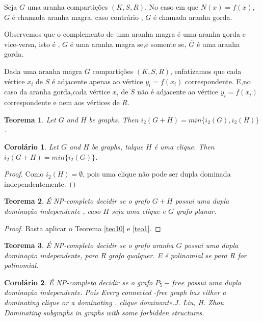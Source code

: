 \documentclass[a4paper,8pt]{article}
\theoremstyle{plain}
\newtheorem{theorem}{Teorema}[section]
\newtheorem{corollary}{Corolário}[section]
\begin{document}
Seja $G$ uma aranha compartições $(K, S, R)$. No caso em que $N(x) = f(x)$,  $G$ é chamada aranha magra,  caso contrário , $G$ é chamada aranha gorda.

Observemos que o complemento de uma aranha magra é uma aranha gorda e vice-versa, isto é , $G$ é uma aranha magra se,e somente se, $\overline{G}$ é uma aranha gorda.


Dada uma aranha magra $G$ compartições $(K, S, R)$, enfatizamos que cada vértice $x_i$ de $S$ é adjacente apenas ao vértice $y_i=f(x_i)$ correspondente. E,no caso da aranha gorda,cada vértice $x_i$ de $S$ não é adjacente ao vértice $y_i=f(x_i)$ correspondente e nem aos vértices de $R$.

\begin{theorem}\cite{leonida2018independent}
 Let $G$ and $H$ be graphs.  Then $i_2(G+H) = min\{i_2(G),i_2(H)\}$.
\end{theorem}

\begin{corollary}
 Let $G$ and $H$ be graphs, talque $H$ é uma clique.  Then $i_2(G+H) = min\{i_2(G)\}$.
\end{corollary}

\begin{proof}\label{teo10}
Como $i_2(H)=\emptyset$, pois uma clique não pode ser dupla dominada independentemente.
\end{proof}

\begin{theorem}
 É NP-completo decidir se o grafo $G+H$ possui uma dupla dominação independente , caso $H$ seja uma clique e $G$ grafo planar. 
\end{theorem}

\begin{proof}
Basta aplicar o Teorema \ref{teo10} e \ref{teo1}.
\end{proof}

\begin{theorem}

É NP-completo decidir se o grafo aranha $G$ possui uma dupla dominação independente, para $R$ grafo qualquer. E é polinomial se para $R$ for polinomial. 

\end{theorem}



\begin{corollary}
  É NP-completo decidir se o grafo $P_5-free$ possui uma dupla dominação independente.  Pois 
  Every connected -free graph has either a dominating clique or a dominating . clique dominante.J. Liu, H. Zhou Dominating subgraphs in graphs with some forbidden structures.
\end{corollary}
\end{document}
